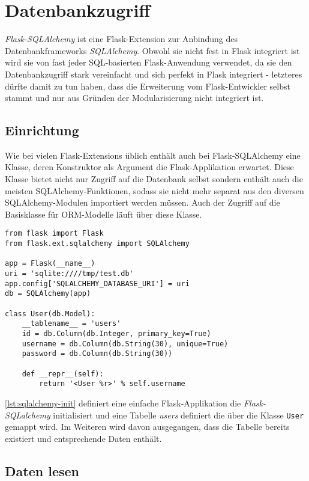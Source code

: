 \section{Datenbankzugriff}

\emph{Flask-SQLAlchemy} ist eine Flask-Extension zur Anbindung des Datenbankframeworks
\emph{SQLAlchemy}. Obwohl sie nicht fest in Flask integriert ist wird sie von fast jeder
SQL-basierten Flask-Anwendung verwendet, da sie den Datenbankzugriff stark vereinfacht und sich
perfekt in Flask integriert - letzteres dürfte damit zu tun haben, dass die Erweiterung vom
Flask-Entwickler selbst stammt und nur aus Gründen der Modularisierung nicht integriert ist.

\subsection{Einrichtung}

Wie bei vielen Flask-Extensions üblich enthält auch bei Flask-SQLAlchemy eine Klasse, deren
Konstruktor als Argument die Flask-Applikation erwartet. Diese Klasse bietet nicht nur Zugriff auf
die Datenbank selbst sondern enthält auch die meisten SQLAlchemy-Funktionen, sodass sie nicht mehr
separat aus den diversen SQLAlchemy-Modulen importiert werden müssen. Auch der Zugriff auf die
Basisklasse für ORM-Modelle läuft über diese Klasse.

\begin{lstlisting}[caption=Flask-SQLAlchemy-Grundstruktur,label=lst:sqlalchemy-init]
from flask import Flask
from flask.ext.sqlalchemy import SQLAlchemy

app = Flask(__name__)
uri = 'sqlite:////tmp/test.db'
app.config['SQLALCHEMY_DATABASE_URI'] = uri
db = SQLAlchemy(app)

class User(db.Model):
    __tablename__ = 'users'
    id = db.Column(db.Integer, primary_key=True)
    username = db.Column(db.String(30), unique=True)
    password = db.Column(db.String(30))

    def __repr__(self):
        return '<User %r>' % self.username
\end{lstlisting}

\autoref{lst:sqlalchemy-init} definiert eine einfache Flask-Applikation die \emph{Flask-SQLalchemy}
initialisiert und eine Tabelle \emph{users} definiert die über die Klasse \lstinline{User} gemappt
wird. Im Weiteren wird davon ausgegangen, dass die Tabelle bereits existiert und entsprechende Daten
enthält.

\subsection{Daten lesen}


